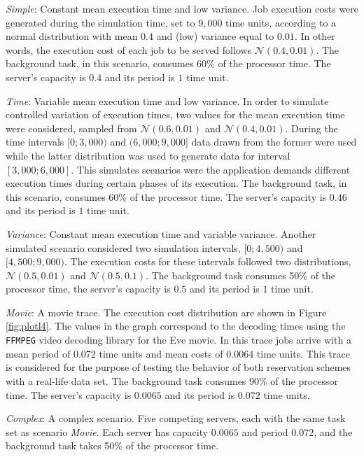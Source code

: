 \documentclass[12pt]{article}
\newcommand{\Lum}{\textit{Simple}}
\newcommand{\Ldois}{\textit{Time}}
\newcommand{\Ltres}{\textit{Variance}}
\newcommand{\Lquatro}{\textit{Movie}}
\newcommand{\Lcinco}{\textit{Complex}}
\begin{document}
\begin{description}
\item \Lum{}: Constant mean execution time and low variance. Job execution
  costs were generated during the simulation time, set to $9,000$ time
  units, according to a normal distribution with mean $0.4$ and (low)
  variance equal to $0.01$. In other words, the execution cost of each
  job to be served follows $\mathcal{N}(0.4,0.01)$. The background
  task, in this scenario, consumes 60\% of the processor time. The
  server's capacity is $0.4$ and its period is $1$ time unit.
\item \Ldois{}: Variable mean execution time and low variance.  In order to
  simulate controlled variation of execution times, two values for the
  mean execution time were considered, sampled from
  $\mathcal{N}(0.6,0.01)$ and $\mathcal{N}(0.4,0.01)$. During the time
  intervals $[0;3,000)$ and $(6,000;9,000]$ data drawn from the former
  were used while the latter distribution was used to generate data
  for interval $[3,000;6,000]$. This simulates scenarios were the
  application demands different execution times during certain phases
  of its execution. The background task, in this scenario, consumes
  60\% of the processor time. The server's capacity is $0.46$ and its
  period is $1$ time unit.
\item \Ltres{}: Constant mean execution time and variable variance.  Another
  simulated scenario considered two simulation intervals, $[0;4,500)$
  and $[4,500;9,000)$.  The execution costs for these intervals
  followed two distributions, $\mathcal{N}(0.5,0.01)$ and
  $\mathcal{N}(0.5,0.1)$. The background task consumes 50\% of the
  processor time, the server's capacity is $0.5$ and its period is $1$
  time unit.
\item \Lquatro{}: A movie trace. The execution cost distribution are shown in
  Figure \ref{fig:plotl4}. The values in the graph correspond to the
  decoding times using the \texttt{FFMPEG} video decoding library for
  the Eve movie. In this trace jobs arrive with a mean period of 0.072
  time units and mean costs of 0.0064 time units. This trace is
  considered for the purpose of testing the behavior of both
  reservation schemes with a real-life data set. The background task
  consumes 90\% of the processor time. The server's capacity is
  $0.0065$ and its period is $0.072$ time units.
\item \Lcinco{}: A complex scenario. Five competing servers, each with the
  same task set as scenario \Lquatro{}. Each server has capacity $0.0065$ and
  period $0.072$, and the background task takes 50\% of the processor
  time.
\end{description}
\end{document}
